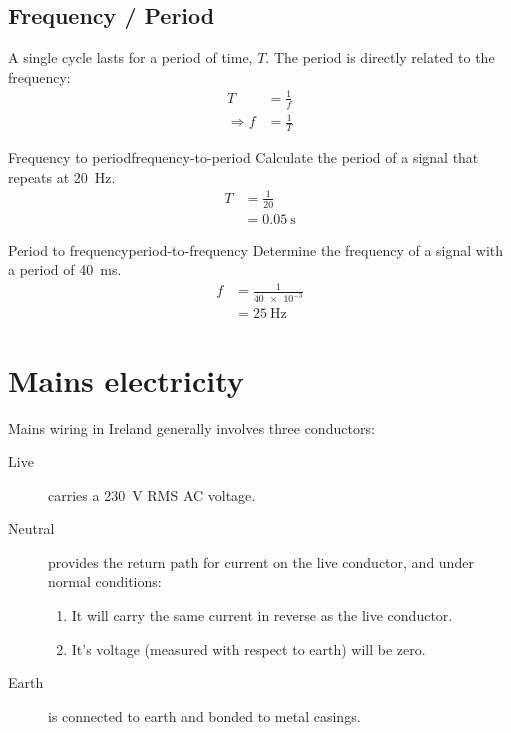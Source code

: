 \subsection{Frequency / Period}
A single cycle lasts for a period of time, $T$.
The period is directly related to the frequency:
\begin{align}
  T & = \frac{1}{f} \\
      \Rightarrow f & = \frac{1}{T}
\end{align}
\begin{example}{Frequency to period}{frequency-to-period}
  Calculate the period of a signal that repeats at \SI{20}{\hertz}.
  \tcblower
  \begin{align}
    T & = \frac{1}{20} \\
      & = \SI{0.05}{\second} 
  \end{align}
\end{example}
\begin{example}{Period to frequency}{period-to-frequency}
  Determine the frequency of a signal with a period of \SI{40}{\milli\second}.
  \tcblower
  \begin{align}
    f & = \frac{1}{\num{40e-3}} \\
      & = \SI{25}{\hertz}
  \end{align}
\end{example}


\section{Mains electricity}

Mains wiring in Ireland generally involves three conductors:
\begin{description}
\item[Live] carries a \SI{230}{\volt} RMS AC voltage.
\item[Neutral] provides the return path for current on the live conductor, and under normal conditions:
  \begin{enumerate}
  \item It will carry the same current in reverse as the live conductor.
  \item It's voltage (measured with respect to earth) will be zero.
  \end{enumerate}
\item[Earth] is connected to earth and bonded to metal casings.
\end{description}



